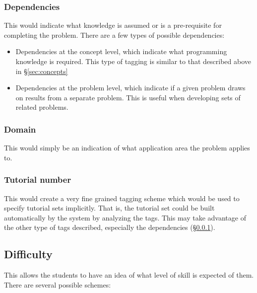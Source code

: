 \subsubsection{Dependencies} \label{sec:dep}
This would indicate what knowledge is assumed or is a pre-requisite for completing the problem. There are a few types of possible dependencies:
\begin{itemize}
\item Dependencies at the concept level, which indicate what programming knowledge is required. This type of tagging is similar to that described above in \S\ref{sec:concepts}
\item Dependencies at the problem level, which indicate if a given problem draws on results from a separate problem. This is useful when developing sets of related problems.
\end{itemize}

\subsubsection{Domain}
This would simply be an indication of what application area the problem applies to.

\subsubsection{Tutorial number}
This would create a very fine grained tagging scheme which would be used to specify tutorial sets implicitly. That is, the tutorial set could be built automatically by the system by analyzing the tags. This may take advantage of the other type of tags described, especially the dependencies (\S\ref{sec:dep}).

\subsection{Difficulty}
This allows the students to have an idea of what level of skill is expected of them. There are several possible schemes:

